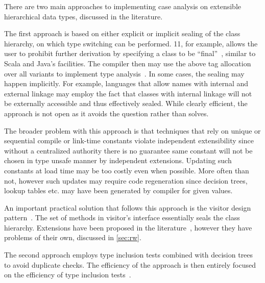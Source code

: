 \noindent
There are two main approaches to implementing case analysis on extensible 
hierarchical data types, discussed in the literature.

The first approach is based on either explicit or implicit sealing of the class 
hierarchy, on which type switching can be performed. \Cpp{}11, for example, allows 
the user to prohibit further derivation by specifying a class to be ``final''~\cite{C++11}, 
similar to Scala and Java's facilities. The compiler then may use the above tag 
allocation over all variants to implement type analysis~\cite[.2]{EmirThesis}. 
In some cases, the sealing may happen implicitly. For example, languages that 
allow names with internal and external linkage may employ the fact that classes 
with internal linkage will not be externally accessible and thus effectively 
sealed. While clearly efficient, the approach is not open as it avoids the 
question rather than solves. 

The broader problem with this approach is that techniques that rely on unique or
sequential compile or link-time constants violate independent extensibility 
since without a centralized authority there is no guarantee same constant will 
not be chosen in type unsafe manner by independent extensions. Updating such 
constants at load time may be too costly even when possible. More often than 
not, however such updates may require code regeneration since decision trees, 
lookup tables etc. may have been generated by compiler for given values.

An important practical solution that follows this approach is the visitor design 
pattern~\cite{DesignPatterns1993}. The set of  methods in visitor's 
interface essentially seals the class hierarchy. Extensions have been proposed 
in the literature~\cite{Zenger:2001}, however they have problems of their own, 
discussed in \textsection\ref{sec:rw}.

The second approach employs type inclusion tests combined with decision 
trees~\cite{Cardelli84} to avoid duplicate checks. The efficiency of the 
approach is then entirely focused on the efficiency of type inclusion 
tests~\cite{Schubert83,Wirth88,Cohen91,Caseau93,Vortex96,Krall97nearoptimal,Vitek97,PQEncoding,FastDynCast,Ducournau08}.


